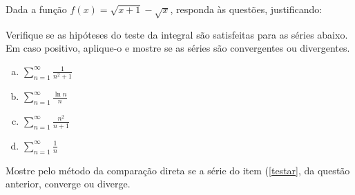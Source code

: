 \documentclass[a4paper, 12pt, addpoints]{exam}
\begin{document}
\info\vspace{-1.5 cm} %
\begin{center}
	\gradetable[h]
\end{center}

\begin{questions}%
\question[2] Dada a função $f(x)=\sqrt{x+1}-\sqrt{x}$, responda às questões, justificando:
\question[2] Verifique se as hipóteses do teste da integral são satisfeitas para as séries abaixo. Em caso positivo, aplique-o e mostre se as séries são convergentes ou divergentes.
\begin{multicols}{4}
\begin{enumerate}[a)]
\item $\sum_{n=1}^\infty \frac{1}{n^2+1}$ 
\item $\sum_{n=1}^\infty \frac{\ln n}{n}$\label{testar}
\item $\sum_{n=1}^\infty \frac{n^2}{n+1}$ 
\item $\sum_{n=1}^\infty \frac{1}{n}$
\end{enumerate}
\end{multicols}
\question[\half] Mostre pelo método da comparação direta se a série do item (\ref{testar}, da questão anterior, converge ou diverge.


\end{questions}
\end{document}
